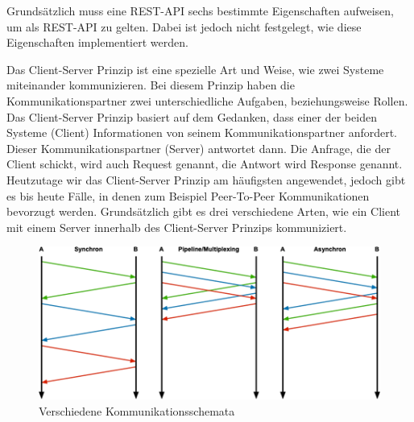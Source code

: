 
Grundsätzlich muss eine REST-API sechs bestimmte Eigenschaften aufweisen, um als REST-API zu gelten. Dabei ist jedoch nicht festgelegt, wie diese Eigenschaften implementiert werden. \cite{RedHatRest}


Das Client-Server Prinzip ist eine spezielle Art und Weise, wie zwei Systeme miteinander kommunizieren. Bei diesem Prinzip haben die Kommunikationspartner zwei unterschiedliche Aufgaben, beziehungsweise Rollen. Das Client-Server Prinzip basiert auf dem Gedanken, dass einer der beiden Systeme (Client) Informationen von seinem Kommunikationspartner anfordert. Dieser Kommunikationspartner (Server) antwortet dann. Die Anfrage, die der Client schickt, wird auch Request genannt, die Antwort wird Response genannt. Heutzutage wir das Client-Server Prinzip am häufigsten angewendet, jedoch gibt es bis heute Fälle, in denen zum Beispiel Peer-To-Peer Kommunikationen bevorzugt werden. Grundsätzlich gibt es drei verschiedene Arten, wie ein Client mit einem Server innerhalb des Client-Server Prinzips kommuniziert. 

\begin{figure}[H]
    \centering
    \includegraphics{media/REST/ClientServer.png}
    \caption{Verschiedene Kommunikationsschemata \cite{ClientServer}}
\end{figure}

